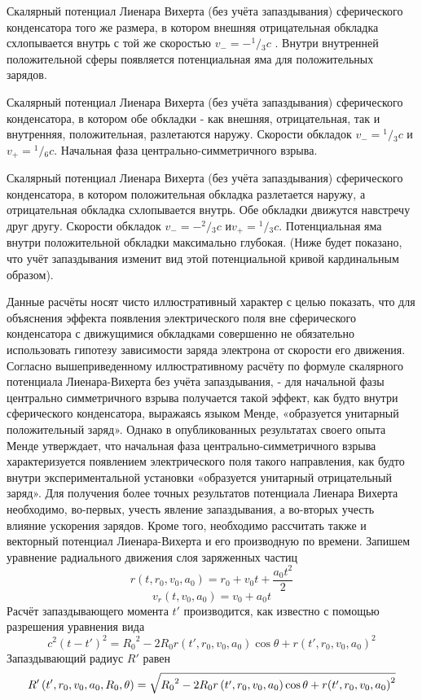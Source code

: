 ﻿\documentclass{article}
\begin{document}
Скалярный потенциал Лиенара Вихерта (без учёта запаздывания) сферического конденсатора того же размера, в котором внешняя отрицательная обкладка схлопывается внутрь с той же скоростью ${{v}_{-}}=-{}^{1}/{}_{3}c$ . Внутри внутренней положительной сферы появляется потенциальная яма для положительных зарядов.

Скалярный потенциал Лиенара Вихерта (без учёта запаздывания) сферического конденсатора, в котором обе обкладки - как внешняя, отрицательная, так и внутренняя, положительная, разлетаются наружу. Скорости обкладок ${{v}_{-}}={}^{1}/{}_{3}c$ и${{v}_{+}}={}^{1}/{}_{6}c$. Начальная фаза центрально-симметричного взрыва. 

Скалярный потенциал Лиенара Вихерта (без учёта запаздывания) сферического конденсатора, в котором положительная обкладка разлетается наружу, а отрицательная обкладка схлопывается внутрь. Обе обкладки движутся навстречу друг другу. Скорости обкладок ${{v}_{-}}=-{}^{2}/{}_{3}c$ и${{v}_{+}}={}^{1}/{}_{3}c$. Потенциальная яма внутри положительной обкладки максимально глубокая. (Ниже будет показано, что учёт запаздывания изменит вид этой потенциальной кривой кардинальным образом).

Данные расчёты носят чисто иллюстративный характер с целью показать, что для объяснения эффекта появления электрического поля вне сферического конденсатора с движущимися обкладками совершенно не обязательно использовать гипотезу зависимости заряда электрона от скорости его движения.
Согласно вышеприведенному иллюстративному расчёту по формуле  скалярного потенциала Лиенара-Вихерта без учёта запаздывания, - для начальной фазы центрально симметричного взрыва получается такой эффект, как будто внутри сферического конденсатора, выражаясь языком Менде, «образуется унитарный положительный заряд». Однако в опубликованных результатах своего опыта Менде утверждает, что начальная фаза центрально-симметричного взрыва характеризуется появлением электрического поля такого направления, как будто внутри экспериментальной установки «образуется унитарный отрицательный заряд».
Для получения более точных результатов потенциала Лиенара Вихерта необходимо, во-первых, учесть явление запаздывания, а во-вторых учесть влияние ускорения зарядов. Кроме того, необходимо рассчитать также и векторный потенциал Лиенара-Вихерта и его производную по времени.
Запишем уравнение радиального движения слоя заряженных частиц
	\[r\left( t,{{r}_{0}},{{v}_{0}},{{a}_{0}} \right)={{r}_{0}}+{{v}_{0}}t+\frac{{{a}_{0}}{{t}^{2}}}{2}\] 	
	\[{{v}_{r}}\left( t,{{v}_{0}},{{a}_{0}} \right)={{v}_{0}}+{{a}_{0}}t\] 	
Расчёт запаздывающего момента $t'$ производится, как известно с помощью разрешения уравнения вида
	\[{{c}^{2}}{{\left( t-t' \right)}^{2}}={{R}_{0}}^{2}-2{{R}_{0}}r\left( t',{{r}_{0}},{{v}_{0}},{{a}_{0}} \right)\cos \theta +r{{\left( t',{{r}_{0}},{{v}_{0}},{{a}_{0}} \right)}^{2}}\] 	
Запаздывающий радиус $R'$  равен
	\[R'\left( t',{{r}_{0}},{{v}_{0}},{{a}_{0}},{{R}_{0}},\theta  \right) = \\
\sqrt{{{R}_{0}}^{2}-2{{R}_{0}}r\left( t',{{r}_{0}},{{v}_{0}},{{a}_{0}} \right)\cos \theta + r{{\left( t',{{r}_{0}},{{v}_{0}},{{a}_{0}} \right)}^{2}}}\] 
\end{document}
